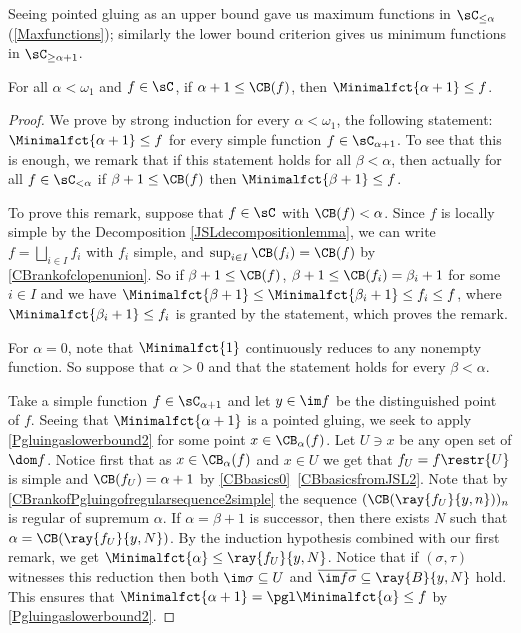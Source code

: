 Seeing pointed gluing as an upper bound gave us maximum functions in $\sC_{\leq \alpha}$ (\cref{Maxfunctions}); similarly the lower bound criterion gives us minimum functions in $\sC_{\geq \alpha+1}$. %

\begin{proposition}\label{Minfunctions}
For all $\alpha<\omega_1$ and $f\in \sC$, if $\alpha+1\leq \CB(f)$, then $\Minimalfct{\alpha+1}\leq f$.
\end{proposition}

\begin{proof}
We prove by strong induction for every $\alpha<\omega_1$, the following statement: $\Minimalfct{\alpha+1}\leq f$ for every simple function $f\in \sC_{\alpha+1}$. To see that this is enough, we remark that if this statement holds for all $\beta<\alpha$, then actually for all $f\in \sC_{<\alpha}$ if $\beta+1\leq\CB(f)$ then $\Minimalfct{\beta+1}\leq f$. 

To prove this remark, suppose that  $f\in \sC$ with $\CB(f)<\alpha$. Since $f$ is locally simple by the Decomposition \cref{JSLdecompositionlemma}, we can write $f=\bigsqcup_{i\in I} f_i$ with $f_i$ simple, and $\sup_{i\in I} \CB(f_i)=\CB(f)$ by \cref{CBrankofclopenunion}. So if $\beta+1\leq \CB(f)$, $\beta+1\leq \CB(f_i)=\beta_i+1$ for some $i\in I$ and we have $\Minimalfct{\beta+1}\leq \Minimalfct{\beta_i+1} \leq f_i\leq f$, where $ \Minimalfct{\beta_i+1} \leq f_i$ is granted by the statement, which proves the remark. 


For $\alpha=0$, note that $\Minimalfct{1}$ continuously reduces to any non\-empty function.
So suppose that $\alpha>0$ and that the statement holds for every $\beta<\alpha$.

Take a simple function $f\in\sC_{\alpha+1}$ and let $y\in\im f$ be the distinguished point of $f$.
Seeing that $\Minimalfct{\alpha+1}$ is a pointed gluing, we seek to apply \cref{Pgluingaslowerbound2} for some point $x\in\CB_\alpha(f)$. Let $U\ni x$ be any open set of $\dom f$. 
Notice first that as $x\in\CB_\alpha(f)$ and $x\in U$ we get that $f_U=f\restr{U}$ is simple and $\CB(f_U)=\alpha+1$ by \cref{CBbasics0}~\cref{CBbasicsfromJSL2}. 
Note that by \cref{CBrankofPgluingofregularsequence2simple} the sequence $(\CB(\ray{f_{U}}{y,n}))_n$ is regular of supremum $\alpha$. If $\alpha=\beta+1$ is successor, then there exists $N$ such that $\alpha=\CB(\ray{f_U}{y,N})$. By the induction hypothesis combined with our first remark, we get $\Minimalfct{\alpha}\leq \ray{f_{U}}{y,N}$.
Notice that if $(\sigma, \tau)$ witnesses this reduction then both $\im \sigma \subseteq U$ and $\overline{\im f\sigma}\subseteq \ray{B}{y,N}$ hold. This ensures that $\Minimalfct{\alpha+1}=\pgl \Minimalfct{\alpha} \leq f$ by \cref{Pgluingaslowerbound2}.



\end{proof}
